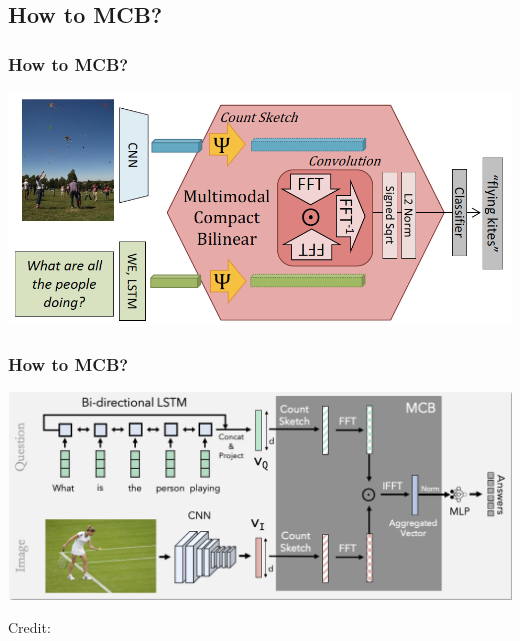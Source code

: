 \documentclass{beamer}
\begin{document}
\subsection{How to MCB?}
\begin{frame}
\frametitle{How to MCB?}
\begin{center}
\includegraphics[scale=0.5]{./images/How_to_MCB01}
\end{center}
\end{frame}
\begin{frame}
\frametitle{How to MCB?}
\begin{center}
\includegraphics[scale=0.5]{./images/mcb}
\end{center}
\begin{center}
\hspace*{12pt}\hbox{\scriptsize Credit:}
\end{center}
\end{frame}
\end{document}
